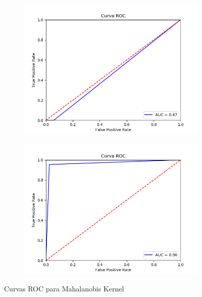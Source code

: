 \begin{figure}[H]
	\centering
	\begin{subfigure}{.49\textwidth}
		\centering
		\includegraphics[scale=0.42]{imagenes/imgs-exp1/roc/Mahalanobis_Kernel_wbc}
	\end{subfigure}
	\begin{subfigure}{.49\textwidth}
		\centering
		\includegraphics[scale=0.42]{imagenes/imgs-exp1/roc/Mahalanobis_Kernel_breastw}
	\end{subfigure}
	\caption{Curvas ROC para Mahalanobis Kernel}
	\label{ROC_MK}
\end{figure}


